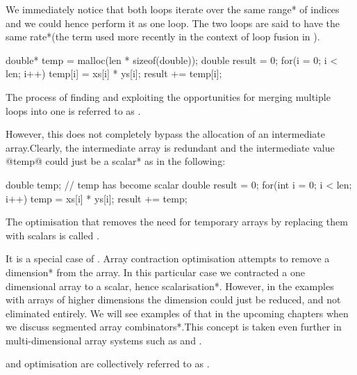 \documentclass[preamble.tex]{subfiles}
\begin{document}
We immediately notice that both loops iterate over the same \*range* of indices and we could hence perform it as one loop. The two loops are said to have the same \*rate*\irate (the term used more recently in the context of loop fusion in \Haskell \cite{FlowFusion}).


\begin{ccode}
double* temp = malloc(len * sizeof(double));
double result = 0;
for(i = 0; i < len; i++) {
	temp[i] = xs[i] * ys[i];
	result += temp[i];
}
\end{ccode}


\begin{bluebox}
The process of finding and exploiting the opportunities for merging multiple loops into one is referred to as .\ifusion
\end{bluebox}


However, this does not completely bypass the allocation of an intermediate array.\iintermediate Clearly, the intermediate array is redundant and the intermediate value @temp@ could just be a \*scalar* as in the following:


\begin{ccode}
double temp; // temp has become scalar
double result = 0;
for(int i = 0; i < len; i++) {
	temp = xs[i] * ys[i];
	result += temp;
}
\end{ccode}


\begin{bluebox}
The optimisation that removes the need for temporary arrays by replacing them with scalars is called .
\end{bluebox}


It is a special case of . Array contraction optimisation attempts to remove a \*dimension* from the array. In this particular case we contracted a one dimensional array to a scalar, hence \*scalarisation*. However, in the examples with arrays of higher dimensions the dimension could just be reduced, and not eliminated entirely. We will see examples of that in the upcoming chapters when we discuss \*segmented array combinators*.\isegcomb This concept is taken even further in multi-dimensional array systems such as  \cite{KCL+10} and  \cite{CKL+11}.


\begin{bluebox}
 and  optimisation are collectively referred to as .
\end{bluebox}
\end{document}
